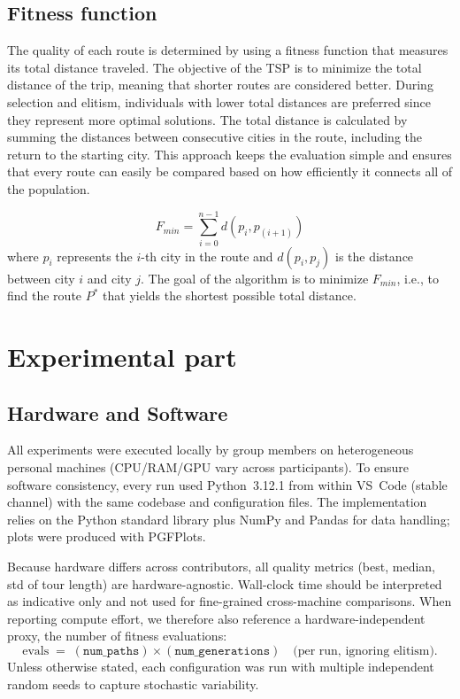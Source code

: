 \documentclass{scrartcl}
\begin{document}
\subsection{Fitness function}
The quality of each route is determined by using a fitness function that measures its total distance traveled. The objective of the TSP is to minimize the total distance of the trip, meaning that shorter routes are considered better. During selection and elitism, individuals with lower total distances are preferred since they represent more optimal solutions. The total distance is calculated by summing the distances between consecutive cities in the route, including the return to the starting city.
This approach keeps the evaluation simple and ensures that every route can easily be compared based on how efficiently it connects all of the population.

\begin{equation}
    F_{min} = \sum_{i=0}^{n-1} d(p_i, p_{(i+1)})
\end{equation}
where $p_i$ represents the $i$-th city in the route and $d(p_i, p_j)$ is the distance between city $i$ and city $j$. The goal of the algorithm is to minimize $F_{min}$, i.e., to find the route $P^*$ that yields the shortest possible total distance.


\section{Experimental part}
\label{sec:experimentation}


\subsection{Hardware and Software}
All experiments were executed locally by group members on heterogeneous personal machines
(CPU/RAM/GPU vary across participants). To ensure software consistency, every run used
Python~3.12.1 from within VS~Code (stable channel) with the same codebase and configuration files.
The implementation relies on the Python standard library plus NumPy and Pandas for data handling;
plots were produced with PGFPlots.

Because hardware differs across contributors, all quality metrics (best, median, std of tour length)
are hardware-agnostic. Wall-clock time should be interpreted as indicative only and not used for
fine-grained cross-machine comparisons. When reporting compute effort, we therefore also reference
a hardware-independent proxy, the number of fitness evaluations:
\[
\text{evals} \;=\; (\texttt{num\_paths}) \times (\texttt{num\_generations})
\quad\text{(per run, ignoring elitism).}
\]
Unless otherwise stated, each configuration was run with multiple independent random seeds to
capture stochastic variability.
\end{document}
